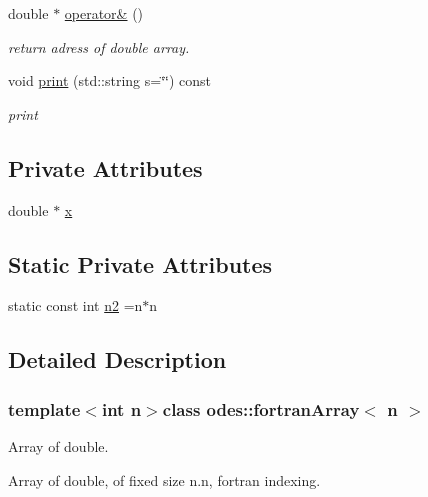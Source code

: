 \begin{DoxyCompactItemize}
\item 
double $\ast$ \hyperlink{classodes_1_1fortranArray_afc0615001fbb2d11c67e33c947478ad7}{operator\&} ()
\begin{DoxyCompactList}\small\item\em return adress of double array. \end{DoxyCompactList}\item 
void \hyperlink{classodes_1_1fortranArray_ab119083abce68d9a216909784f42821d}{print} (std\-::string s=\char`\"{}\char`\"{}) const 
\begin{DoxyCompactList}\small\item\em print \end{DoxyCompactList}\end{DoxyCompactItemize}
\subsection*{Private Attributes}
\begin{DoxyCompactItemize}
\item 
double $\ast$ \hyperlink{classodes_1_1fortranArray_a71fc035c3f3ff899674122533b6713c1}{x}
\end{DoxyCompactItemize}
\subsection*{Static Private Attributes}
\begin{DoxyCompactItemize}
\item 
static const int \hyperlink{classodes_1_1fortranArray_a730a0a23dd09551539653ee6fd2c973d}{n2} =n$\ast$n
\end{DoxyCompactItemize}


\subsection{Detailed Description}
\subsubsection*{template$<$int n$>$class odes\-::fortran\-Array$<$ n $>$}

Array of double. 

Array of double, of fixed size n.\-n, fortran indexing. 

